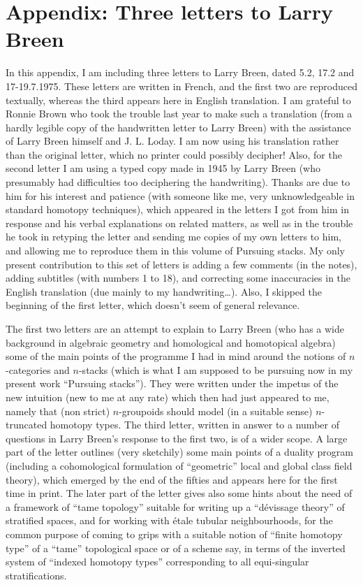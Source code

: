 \chapter*{Appendix: Three letters to Larry Breen}
\label{ch:AppchI}

In this appendix, I am including three letters to Larry Breen, dated 5.2, 
17.2 and 17-19.7.1975. These letters are written in French, and the first 
two are reproduced textually, whereas the third appears here in English translation.
I am grateful to Ronnie Brown who took the trouble last year to make such a translation 
(from a hardly legible copy of the handwritten letter to Larry Breen) with the assistance of Larry Breen himself and J. L. Loday. I am now using his translation rather than the original letter, which no printer could possibly decipher!
Also, for the second letter I am using a typed copy made in 1945 by Larry Breen (who presumably had difficulties too deciphering the handwriting). Thanks are due to him for his interest and patience (with someone like me, very unknowledgeable in standard homotopy techniques), which appeared in the letters I got from him in response and his verbal explanations on related matters, as well as in the trouble he took in retyping the letter and sending me copies of my own letters to him, and allowing me to reproduce them in this volume of Pursuing stacks. My only present contribution to this set of letters is adding a few comments (in the notes), adding subtitles (with numbers 1 to 18), and correcting some inaccuracies in the English translation (due mainly to my handwriting\dots). 
Also, I skipped the beginning of the first letter, which doesn't seem of general relevance.

The first two letters are an attempt to explain to Larry Breen (who has a wide background in algebraic geometry and homological and homotopical algebra) some of the main points of the programme I had in mind around the notions of $n$-categories and $n$-stacks (which is what I am supposed to be pursuing now in my present work ``Pursuing stacks''). They were written under the impetus of the new intuition (new to me at any rate) which then had just appeared to me, namely that (non strict) $n$-groupoids should model (in a suitable sense) $n$-truncated homotopy types. The third letter, written in answer to a number of questions in Larry Breen's response to the first two, is of a wider scope. A large part of the letter outlines (very sketchily) some main points of a duality program (including a cohomological formulation of ``geometric'' local and global class field theory), which emerged by the end of the fifties and appears here for the first time in print. The later part of the letter gives also some hints about the need of a framework of ``tame topology'' suitable for writing up a ``dévissage theory'' of stratified spaces, and for working with étale tubular neighbourhoods, for the common purpose of coming to grips with a suitable notion of ``finite homotopy type'' of a ``tame'' topological space or of a scheme say, in terms of the inverted system of ``indexed homotopy types'' corresponding to all equi-singular stratifications.


